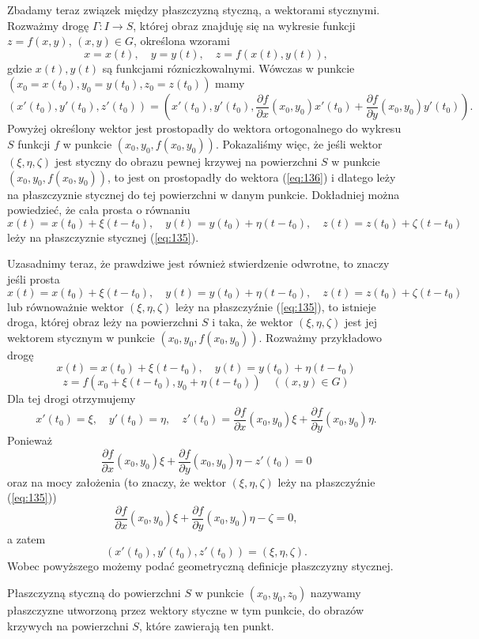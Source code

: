 \documentclass[leqno]{article}
\begin{document}
\begin{justify}
Zbadamy teraz związek między płaszczyzną styczną, a wektorami stycznymi. Rozważmy drogę $\Gamma : I \to S$, której obraz znajduję się na wykresie 
funkcji $z = f(x,y)$, $(x,y) \in G$, określona wzorami 
\[
    x = x(t), \quad y = y(t), \quad z = f(x(t), y(t)),
\]
gdzie $x(t),y(t)$ są funkcjami rózniczkowalnymi. Wówczas w punkcie $(x_0 = x(t_0), y_0 = y(t_0), z_0 = z(t_0))$ mamy 
\[
    (x'(t_0), y'(t_0), z'(t_0)) = (x'(t_0), y'(t_0), \frac{\partial f}{\partial x}(x_0, y_0)x'(t_0) + \frac{\partial f}{\partial y}(x_0, y_0)y'(t_0)).
\]
Powyżej określony wektor jest prostopadły do wektora ortogonalnego do wykresu $S$ funkcji $f$ w punkcie $(x_0, y_0, f(x_0, y_0))$.
Pokazaliśmy więc, że jeśli wektor $(\xi, \eta, \zeta)$ jest styczny do obrazu pewnej krzywej na powierzchni $S$ w punkcie $(x_0, y_0, f(x_0, y_0))$, to 
jest on prostopadły do wektora (\ref{eq:136}) i dlatego leży na płaszczyznie stycznej do tej powierzchni w danym punkcie. Dokładniej można powiedzieć, że 
cała prosta o równaniu 
\[
    x(t) = x(t_0) + \xi(t - t_0), \quad y(t) = y(t_0) + \eta(t - t_0), \quad z(t) = z(t_0) + \zeta(t - t_0)
\]
leży na płaszczyznie stycznej (\ref{eq:135}).

Uzasadnimy teraz, że prawdziwe jest również stwierdzenie odwrotne, to znaczy jeśli prosta
\[
    x(t) = x(t_0) + \xi(t - t_0), \quad y(t) = y(t_0) + \eta(t - t_0), \quad z(t) = z(t_0) + \zeta(t - t_0)
\]
lub równoważnie wektor $(\xi, \eta, \zeta)$ leży na płaszczyźnie (\ref{eq:135}), to istnieje
droga, której obraz leży na powierzchni $S$ i taka, że wektor $(\xi, \eta, \zeta)$ jest jej wektorem stycznym w punkcie $(x_0, y_0, f(x_0,y_0))$.
Rozważmy przykładowo drogę 
\[
    x(t) = x(t_0) + \xi(t - t_0), \quad y(t) = y(t_0) + \eta(t - t_0)
\]
\[
    z = f(x_0 + \xi(t-t_0), y_0 + \eta(t-t_0)) \quad ((x,y) \in G)
\]
Dla tej drogi otrzymujemy 
\[
    x'(t_0) = \xi, \quad y'(t_0) = \eta, \quad z'(t_0) = \frac{\partial f}{\partial x}(x_0, y_0)\xi + \frac{\partial f}{\partial y}(x_0, y_0)\eta.
\]
Ponieważ 
\[
    \frac{\partial f}{\partial x}(x_0, y_0)\xi + \frac{\partial f}{\partial y}(x_0, y_0)\eta - z'(t_0) = 0
\]
oraz na mocy założenia (to znaczy, że wektor $(\xi, \eta, \zeta)$ leży na płaszczyźnie (\ref{eq:135}))
\[
    \frac{\partial f}{\partial x}(x_0, y_0)\xi + \frac{\partial f}{\partial y}(x_0, y_0)\eta - \zeta = 0,
\]
a zatem 
\[
    (x'(t_0), y'(t_0), z'(t_0)) = (\xi, \eta, \zeta).
\]
Wobec powyższego możemy podać geometryczną definicje płaszczyzny stycznej.

\begin{defn}
    Płaszczyzną styczną do powierzchni $S$ w punkcie $(x_0, y_0, z_0)$ nazywamy płaszczyzne utworzoną przez wektory styczne w tym punkcie, do obrazów krzywych na 
    powierzchni $S$, które zawierają ten punkt.
\end{defn}


\end{justify}
\end{document}
